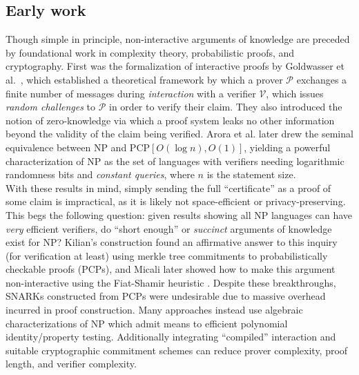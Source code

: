 \subsection{Early work}
\noindent Though simple in principle, non-interactive arguments of knowledge are preceded by foundational work in complexity theory, probabilistic proofs, and cryptography. First was the formalization of interactive proofs by Goldwasser et al.\ \cite{ipfirst}, which established a theoretical framework by which a prover $\mathcal{P}$ exchanges a finite number of messages during \textit{interaction} with a verifier $\mathcal{V}$, which issues \textit{random challenges} to $\mathcal{P}$ in order to verify their claim. They also introduced the notion of zero-knowledge via which a proof system leaks no other information beyond the validity of the claim being verified. Arora et al. \cite{pcpthm1, pcpthm2} later drew the seminal equivalence between NP and PCP$[O(\log n), O(1)]$, yielding a powerful characterization of NP as the set of languages with verifiers needing logarithmic randomness bits and \textit{constant queries}, where $n$ is the statement size.\\

\noindent With these results in mind, simply sending the full ``certificate'' as a proof of some claim is impractical, as it is likely not space-efficient or privacy-preserving. This begs the following question: given results showing all NP languages can have \textit{very} efficient verifiers, do ``short enough'' or \textit{succinct} arguments of knowledge exist for NP? Kilian's construction \cite{kilian} found an affirmative answer to this inquiry (for verification at least) using merkle tree commitments to probabilistically checkable proofs (PCPs), and Micali later showed how to make this argument non-interactive \cite{micalisnark} using the Fiat-Shamir heuristic \cite{fiatshamir}. Despite these breakthroughs, SNARKs constructed from PCPs were undesirable due to massive overhead incurred in proof construction. Many approaches instead use algebraic characterizations of NP which admit means to efficient polynomial identity/property testing. Additionally integrating ``compiled'' interaction and suitable cryptographic commitment schemes can reduce prover complexity, proof length, and verifier complexity.\\

